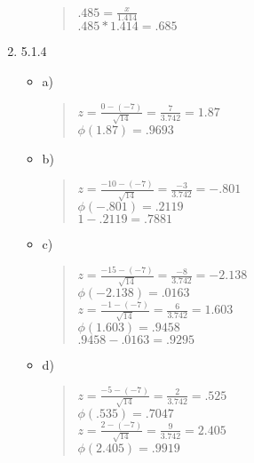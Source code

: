 \documentclass{article}
\begin{document}
\begin{enumerate}
\begin{itemize}
\begin{quote}
                $.485 = \frac{x}{1.414}$ \\ 
                $.485*1.414 = .685$
            \end{quote}
        \end{itemize}
    \item 5.1.4 
        \begin{itemize}
            \item a)
            \begin{quote}
                $z = \frac{0-(-7)}{\sqrt{14}} = \frac{7}{3.742} = 1.87$ \\
                $\phi(1.87) = .9693$
            \end{quote}
        \end{itemize}
        \begin{itemize}
            \item b)
            \begin{quote}
                $z = \frac{-10-(-7)}{\sqrt{14}} = \frac{-3}{3.742} = -.801$ \\
                $\phi(-.801) = .2119$ \\
                $1-.2119 = .7881$
            \end{quote}
        \end{itemize}
        \begin{itemize}
            \item c)
            \begin{quote}
                $z = \frac{-15-(-7)}{\sqrt{14}} = \frac{-8}{3.742} = -2.138$ \\
                $\phi(-2.138) = .0163$ \\
                $z = \frac{-1-(-7)}{\sqrt{14}} = \frac{6}{3.742} = 1.603$ \\
                $\phi(1.603) = .9458$ \\
                $.9458-.0163 = .9295$
            \end{quote}
        \end{itemize}
        \begin{itemize}
            \item d)
            \begin{quote}
                $z = \frac{-5-(-7)}{\sqrt{14}} = \frac{2}{3.742} = .525$ \\
                $\phi(.535) = .7047$ \\
                $z = \frac{2-(-7)}{\sqrt{14}} = \frac{9}{3.742} = 2.405$ \\
                $\phi(2.405) = .9919$ \\

\end{quote}
\end{itemize}
\end{enumerate}
\end{document}
